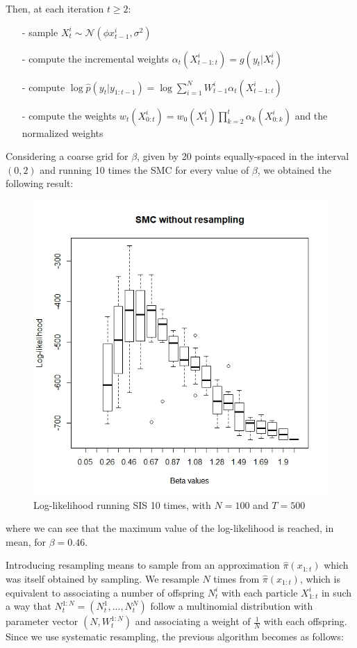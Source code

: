 \documentclass[]{article}
\begin{document}
Then, at each iteration $t \geq 2$:
\begin{enumerate}
	\item[-] sample $X_t^i \sim \mathcal{N}(\phi x_{t-1}^i,\sigma^2) $
	\item[-] compute the incremental weights $ \alpha_t(X_{t-1:t}^i) = g(y_t|X_t^i) $
	\item[-] compute $\log \hat{p}(y_t|y_{1:t-1})=\log\sum_{i=1}^{N}W_{t-1}^i\alpha_t(X_{t-1:t}^i)$
	\item[-] compute the weights $
	w_t(X_{0:t}^i)=w_0(X_1^i)\prod_{k=2}^{t}\alpha_k(X_{0:k}^i)$ and the normalized weights
\end{enumerate}
Considering a coarse grid for $\beta$, given by 20 points equally-spaced in the interval $(0,2)$ and running 10 times the SMC for every value of $\beta$, we obtained the following result:
\begin{figure}
	\includegraphics[width=\columnwidth]{task1/SIS_N_100_T_500.jpeg}
	\caption{Log-likelihood running SIS 10 times, with $N=100$ and $T=500$}
\end{figure}
where we can see that the maximum value of the log-likelihood is reached, in mean, for $\beta=0.46$.

Introducing resampling means to sample from an approximation $\hat{\pi}(x_{1:t})$ which was itself obtained by sampling. We resample $N$ times from $\hat{\pi}(x_{1:t})$, which is equivalent to associating a number of offspring $N_t^i$ with each particle $X_{1:t}^i$ in such a way that $N_t^{1:N} = (N_t^1, ..., N_t^N)$ follow a multinomial distribution with parameter vector $(N, W_t^{1:N})$ and associating a weight of $\frac{1}{N}$ with each offspring. Since we use systematic resampling, the previous algorithm becomes as follows:
\end{document}
